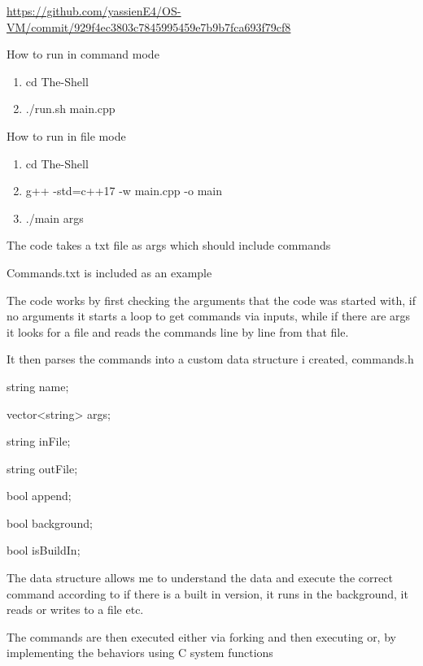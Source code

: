 \href{https://github.com/yassienE4/OS-VM/commit/929f4ec3803c7845995459e7b9b7fca693f79cf8}{\ul{https://github.com/yassienE4/OS-VM/commit/929f4ec3803c7845995459e7b9b7fca693f79cf8}}

How to run in command mode

\begin{enumerate}
\def\labelenumi{\arabic{enumi}.}
\item
  cd The-Shell
\item
  ./run.sh main.cpp
\end{enumerate}

How to run in file mode

\begin{enumerate}
\def\labelenumi{\arabic{enumi}.}
\item
  cd The-Shell
\item
  g++ -std=c++17 -w main.cpp -o main
\item
  ./main args
\end{enumerate}

The code takes a txt file as args which should include commands

Commands.txt is included as an example

The code works by first checking the arguments that the code was started
with, if no arguments it starts a loop to get commands via inputs, while
if there are args it looks for a file and reads the commands line by
line from that file.

It then parses the commands into a custom data structure i created,
commands.h

string name;

vector\textless string\textgreater{} args;

string inFile;

string outFile;

bool append;

bool background;

bool isBuildIn;

The data structure allows me to understand the data and execute the
correct command according to if there is a built in version, it runs in
the background, it reads or writes to a file etc.

The commands are then executed either via forking and then executing or,
by implementing the behaviors using C system functions
